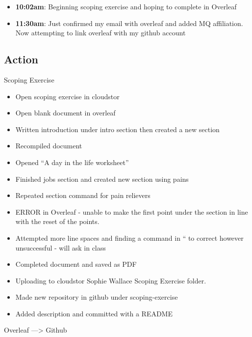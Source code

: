 \documentclass{article}
\begin{document}
\begin{itemize}
\item \textbf{10:02am}: Beginning scoping exercise and hoping to complete in Overleaf
\item \textbf{11:30am}: Just confirmed my email with overleaf and added MQ affiliation. Now attempting to link overleaf with my github account
\end{itemize}

\subsection{Action}

Scoping Exercise

\begin{itemize}
\item Open scoping exercise in cloudstor
\item Open blank document in overleaf
\item Written introduction under intro section then created a new section
\item Recompiled document 
\item Opened “A day in the life worksheet”
\item Finished jobs section and created new section using pains
\item Repeated section command for pain relievers
\item ERROR in Overleaf - unable to make the first point under the section in line with the reset of the points.
\item Attempted more line spaces and finding a command in “\” to correct however unsuccessful - will ask in class
\item Completed document and saved as PDF
\item Uploading to cloudstor Sophie Wallace Scoping Exercise folder.
\item Made new repository in github under scoping-exercise 
\item Added description and committed with a README
\end{itemize}


Overleaf —> Github
\end{document}

